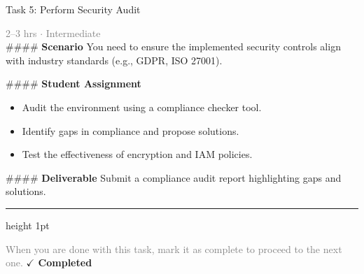 \documentclass[10pt,a4paper]{article}
\begin{document}
\begin{taskbox}{Task 5: Perform Security Audit}

    {\small \textcolor{gray}{2--3 hrs $\cdot$ Intermediate}}\\[12pt]

    \#\#\#\# \textbf{Scenario}
You need to ensure the implemented security controls align with industry standards (e.g., GDPR, ISO 27001).

\#\#\#\# \textbf{Student Assignment}
\begin{itemize}
    \item Audit the environment using a compliance checker tool.
    \item Identify gaps in compliance and propose solutions.
    \item Test the effectiveness of encryption and IAM policies.
\end{itemize}

\#\#\#\# \textbf{Deliverable}
Submit a compliance audit report highlighting gaps and solutions.\par

    \vspace{16pt}

    \textcolor{cardBorder}{\hrule height 1pt}\vspace{8pt}

    \small \textcolor{gray}{When you are done with this task, mark it as complete to proceed to the next one.} \hfill \textbf{\textcolor{brandDark}{$\checkmark$ Completed}}

\end{taskbox}
\end{document}

